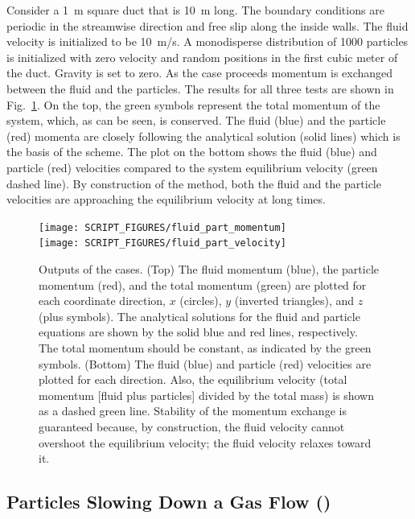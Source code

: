 \documentclass[11pt]{book}
\begin{document}
Consider a 1~m square duct that is 10~m long.  The boundary conditions are periodic in the streamwise direction and free slip along the inside walls. The fluid velocity is initialized to be 10~m/s. A monodisperse distribution of 1000 particles is initialized with zero velocity and random positions in the first cubic meter of the duct. Gravity is set to zero. As the case proceeds momentum is exchanged between the fluid and the particles. The results for all three tests are shown in Fig.~\ref{fig_fluid_part_mom}.  On the top, the green symbols represent the total momentum of the system, which, as can be seen, is conserved.  The fluid (blue) and the particle (red) momenta are closely following the analytical solution (solid lines) which is the basis of the scheme.  The plot on the bottom shows the fluid (blue) and particle (red) velocities compared to the system equilibrium velocity (green dashed line).  By construction of the method, both the fluid and the particle velocities are approaching the equilibrium velocity at long times.

\begin{figure}[h]
\centering
\texttt{[image: SCRIPT\_FIGURES/fluid\_part\_momentum]}\\
\texttt{[image: SCRIPT\_FIGURES/fluid\_part\_velocity]}
\caption[Test of fluid-particle momentum transfer for nonstationary particles]{Outputs of the  cases.  (Top) The fluid momentum (blue), the particle momentum (red), and the total momentum (green) are plotted for each coordinate direction, $x$ (circles), $y$ (inverted triangles), and $z$ (plus symbols).  The analytical solutions for the fluid and particle equations are shown by the solid blue and red lines, respectively. The total momentum should be constant, as indicated by the green symbols. (Bottom) The fluid (blue) and particle (red) velocities are plotted for each direction.  Also, the equilibrium velocity (total momentum [fluid plus particles] divided by the total mass) is shown as a dashed green line.  Stability of the momentum exchange is guaranteed because, by construction, the fluid velocity cannot overshoot the equilibrium velocity; the fluid velocity relaxes toward it.}
\label{fig_fluid_part_mom}
\end{figure}


\subsection{Particles Slowing Down a Gas Flow (\texorpdfstring{}{particle\_drag})}
\label{particle_drag}
\label{particle_drag_U10_N16}
\label{particle_drag_U50_N16}
\label{particle_drag_U100_N16}
\label{particle_drag_U50_N1600}
\label{particle_drag_U100_N1600}
\label{particle_drag_U150_N1600}
\end{document}
